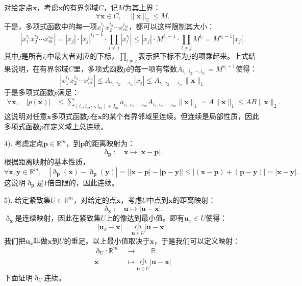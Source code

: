 \documentclass[12pt,UTF8]{ctexbook}
\begin{document}
\begin{so}
    对给定点$\mathbf{x}$，考虑$\mathbf{x}$的有界邻域$C$，记$M$为其上界：
    $$ \forall \mathbf{x}\in C, \quad \|\mathbf{x}\|_2 \leqslant M.$$
    于是，多项式函数中的每一项$x_1^{i_1} x_2^{i_2}\cdots x_m^{i_m}$，都可以这样限制其大小：
    $$ \left|x_1^{i_1} x_2^{i_2}\cdots x_m^{i_m}\right| = |x_j|\cdot |x_j|^{i_j-1} \cdot \prod_{l\neq j} \left|x_l^{i_l}\right| \leqslant |x_j| \cdot M^{i_j-1} \cdot\prod_{l\neq j} M^{i_l} = M^{s_i - 1} |x_j| . $$
    其中$j$是所有$i_l$中最大者对应的下标，$\prod_{l\neq j}$表示把下标不为$j$的项乘起来。上式结果说明，在有界邻域$C$里，多项式函数$p$的每一项有常数$A_{i_1, i_2, \cdots, i_m} = M^{s_i - 1}$使得：
    $$  \left|x_1^{i_1} x_2^{i_2}\cdots x_m^{i_m}\right| \leqslant A_{i_1, i_2, \cdots, i_m} |x_j| \leqslant A_{i_1, i_2, \cdots, i_m} \|\mathbf{x}\|_1 $$
    于是多项式函数$p$满足：
    \begin{align*}
        \forall \mathbf{x}, \quad |p(\mathbf{x})| &\leqslant \sum_{(i_1,i_2,\cdots, i_m)\in I_m} a_{i_1, i_2, \cdots, i_m}A_{i_1, i_2, \cdots, i_m}\|\mathbf{x}\|_1 = A\|\mathbf{x}\|_1 \leqslant AB\|\mathbf{x}\|_2.
    \end{align*}
    这说明对任意$\mathbf{x}$多项式函数$p$在$\mathbf{x}$的某个有界邻域里连续。但连续是局部性质，因此多项式函数$p$在定义域上总连续。

    4). 考虑定点$\mathbf{p}\in\mathbb{R}^m$，到$\mathbf{p}$的距离映射为：
    $$ \eth_{\mathbf{p}}: \quad \mathbf{x}\mapsto |\mathbf{x} - \mathbf{p}|.$$
    根据距离映射的基本性质，
    $$ \forall \mathbf{x}, \mathbf{y} \in \mathbb{R}^m, \quad |\eth_{\mathbf{p}}(\mathbf{x}) - \eth_{\mathbf{p}}(\mathbf{y})| =\big| |\mathbf{x} - \mathbf{p}| - |\mathbf{p} - \mathbf{y}| \big| \leqslant |(\mathbf{x} - \mathbf{p}) + (\mathbf{p} - \mathbf{y})| = |\mathbf{x} - \mathbf{y}|. $$
    这说明$\eth_{\mathbf{p}}$是$1$倍自限的，因此连续。

    5). 给定紧致集$U\in\mathbb{R}^m$，对给定的点$\mathbf{x}$，考虑$U$中点到$\mathbf{x}$的距离映射：
    $$ \eth_{\mathbf{x}}: \quad \mathbf{u}\mapsto |\mathbf{u} - \mathbf{x}|.$$
    $\eth_{\mathbf{x}}$是连续映射，因此在紧致集$U$上的像达到最小值。即有$\mathbf{u}_x\in U$使得：
    $$ |\mathbf{u}_x - \mathbf{x}| = \underset{\mathbf{u}\in U}{\text{小}} |\mathbf{u} - \mathbf{x}| .$$
    我们把$\mathbf{u}_x$叫做$\mathbf{x}$到$U$的垂足。以上最小值取决于$\mathbf{x}$，于是我们可以定义映射：
    \begin{align*}
        \eth_{U} : \mathbb{R}^m\; &\rightarrow \qquad \mathbb{R} \\
        \mathbf{x} \quad &\mapsto \underset{\mathbf{u}\in U}{\text{小}} |\mathbf{u} - \mathbf{x}|
    \end{align*}
    下面证明$\eth_{U}$连续。


\end{so}
\end{document}
